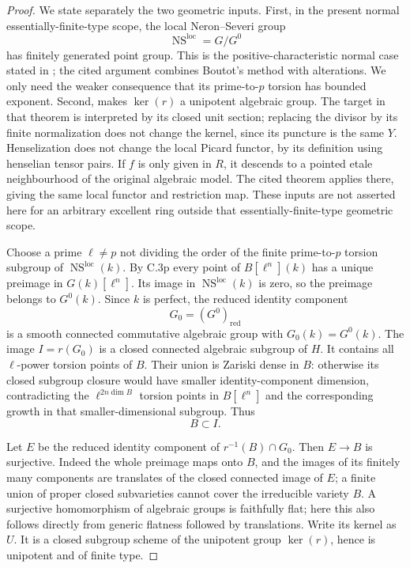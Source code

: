 \begin{proof}
We state separately the two geometric inputs.
First, in the present normal essentially-finite-type
scope, the local Neron--Severi group
\[
                  \operatorname{NS}^{\mathrm{loc}}
                         =G/G^0
\]
has finitely generated point group. This is
the positive-characteristic normal case stated
in \citet[Definition 3.4 and the following
paragraph, p.~468]{D_Kollar2016LocalPicard};
the cited argument combines Boutot's method
with alterations. We only need the weaker
consequence that its prime-to-$p$ torsion
has bounded exponent. Second,
\citet[Theorem 1.7(ii), p.~463, with Definition
3.3]{D_Kollar2016LocalPicard} makes
$\ker(r)$ a unipotent algebraic group.
The target in that theorem is interpreted by
its closed unit section; replacing the divisor
by its finite normalization does not change
the kernel, since its puncture is the same
$Y$. Henselization does not change the local
Picard functor, by its definition using henselian
tensor pairs. If $f$ is only given in $R$, it
descends to a pointed etale neighbourhood of
the original algebraic model. The cited
theorem applies there, giving the same local
functor and restriction map. These inputs are
not asserted here for an arbitrary excellent
ring outside that essentially-finite-type
geometric scope.

Choose a prime $\ell\ne p$ not dividing the
order of the finite prime-to-$p$ torsion
subgroup of $\operatorname{NS}^{\mathrm{loc}}(k)$.
By C.3p every point of $B[\ell^n](k)$ has a
unique preimage in $G(k)[\ell^n]$. Its image
in $\operatorname{NS}^{\mathrm{loc}}(k)$ is zero,
so the preimage belongs to $G^0(k)$. Since
$k$ is perfect, the reduced identity component
\[
                          G_0=(G^0)_{\mathrm{red}}
\]
is a smooth connected commutative algebraic
group with $G_0(k)=G^0(k)$.
The image $I=r(G_0)$ is a closed connected
algebraic subgroup of $H$. It contains all
$\ell$-power torsion points of $B$.
Their union is Zariski dense in $B$: otherwise
its closed subgroup closure would have smaller
identity-component dimension, contradicting
the $\ell^{2n\dim B}$ torsion points in
$B[\ell^n]$ and the corresponding growth in
that smaller-dimensional subgroup. Thus
\[
                              B\subset I.
\]

Let $E$ be the reduced identity component
of $r^{-1}(B)\cap G_0$. Then $E\to B$ is
surjective. Indeed the whole preimage maps
onto $B$, and the images of its finitely
many components are translates of the
closed connected image of $E$; a finite
union of proper closed subvarieties cannot
cover the irreducible variety $B$. A
surjective homomorphism of algebraic groups
is faithfully flat; here this also follows
directly from generic flatness followed
by translations. Write its kernel as $U$.
It is a closed subgroup scheme of the
unipotent group $\ker(r)$, hence is
unipotent and of finite type.


\end{proof}
